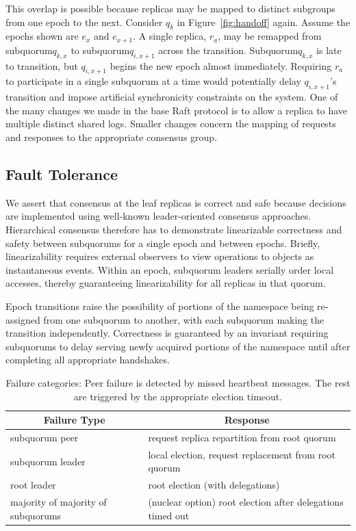 \documentclass[letterpaper,10pt,twocolumn]{article}
\newcommand{\sub}{subquorum\xspace}
\newcommand{\Sub}{Subquorum\xspace}
\newcommand{\subs}{subquorums\xspace}
\newcommand{\roo}{root quorum\xspace}
\def\mcn#1{\multicolumn{1}{c}{#1}}
\begin{document}
This overlap is possible because replicas may be mapped to distinct subgroups
from one epoch to the next.
Consider $q_k$ in Figure~\ref{fig:handoff} again.
Assume the epochs shown are $e_x$ and $e_{x+1}$.
A single replica, $r_a$, may be remapped from \sub $q_{k,x}$ to \sub $q_{i,x+1}$ across the
transition.
\Sub $q_{k,x}$ is late to transition, but $q_{i,x+1}$ begins the new epoch
almost immediately.
Requiring $r_a$ to participate in a single \sub at a time would potentially delay
$q_{i,x+1}$'s transition and impose artificial synchronicity constraints on the
system.
One of the many changes we made in the base Raft protocol is to
allow a replica to have multiple distinct shared
logs.
Smaller changes concern the mapping of requests and responses to the appropriate
consensus group.


\subsection{Fault Tolerance}

We assert that consensus at the leaf replicas is correct and safe because decisions are
implemented using well-known leader-oriented consensus approaches.
Hierarchical consensus therefore has to demonstrate linearizable correctness and safety
between \subs for a single epoch and between epochs.
Briefly, linearizability requires external observers to view operations to objects as
instantaneous events.
Within an epoch, subquorum leaders serially order local accesses, thereby guaranteeing
linearizability for all replicas in that quorum.

Epoch transitions raise the possibility of portions of the namespace being re-assigned from one \sub to
another, with each \sub making the transition independently.
Correctness is guaranteed by an invariant requiring \subs to delay serving newly
acquired portions of the namespace until after completing all appropriate handshakes.


\begin{table}[t]
  \centering
  \begin{tabular}{l|l} \hline
    \mcn{Failure Type} & \mcn{Response} \\ \hline
    \sub peer & request replica repartition from \roo \\
    \sub leader & local election, request replacement from \roo \\
    root leader & root election (with delegations)\\
    majority of majority of \subs & (nuclear option) root election after delegations
                                    timed out \\
  \end{tabular}
  \caption{Failure categories: Peer failure is detected by missed heartbeat
    messages. The rest are triggered by the appropriate election timeout.}
  \label{tab:categories}
\end{table}
\end{document}
